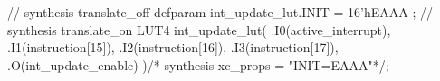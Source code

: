 \begin{vcode}
// synthesis translate_off 
defparam int_update_lut.INIT = 16'hEAAA ;
// synthesis translate_on 
LUT4 int_update_lut( 
.I0(active_interrupt),
.I1(instruction[15]),
.I2(instruction[16]),
.I3(instruction[17]),
.O(int_update_enable) )/* synthesis xc_props = "INIT=EAAA"*/;
\end{vcode}

